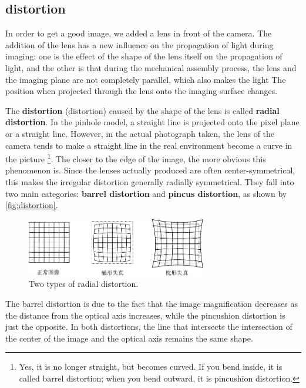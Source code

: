 \subsection{distortion}

In order to get a good image, we added a lens in front of the camera. The addition of the lens has a new influence on the propagation of light during imaging: one is the effect of the shape of the lens itself on the propagation of light, and the other is that during the mechanical assembly process, the lens and the imaging plane are not completely parallel, which also makes the light The position when projected through the lens onto the imaging surface changes.

The \textbf{distortion} (distortion) caused by the shape of the lens is called \textbf{radial distortion}. In the pinhole model, a straight line is projected onto the pixel plane or a straight line. However, in the actual photograph taken, the lens of the camera tends to make a straight line in the real environment become a curve in the picture \footnote{Yes, it is no longer straight, but becomes curved. If you bend inside, it is called barrel distortion; when you bend outward, it is pincushion distortion. }. The closer to the edge of the image, the more obvious this phenomenon is. Since the lenses actually produced are often center-symmetrical, this makes the irregular distortion generally radially symmetrical. They fall into two main categories: \textbf{barrel distortion} and \textbf{pincus distortion}, as shown by \autoref{fig:distortion}.

\begin{figure}[!t]
	\centering
	\includegraphics[width=0.7\textwidth]{chapter05/resources/cameraModel/distortion.pdf}
	\caption{Two types of radial distortion.}
	\label{fig:distortion}
\end{figure}

The barrel distortion is due to the fact that the image magnification decreases as the distance from the optical axis increases, while the pincushion distortion is just the opposite. In both distortions, the line that intersects the intersection of the center of the image and the optical axis remains the same shape.

